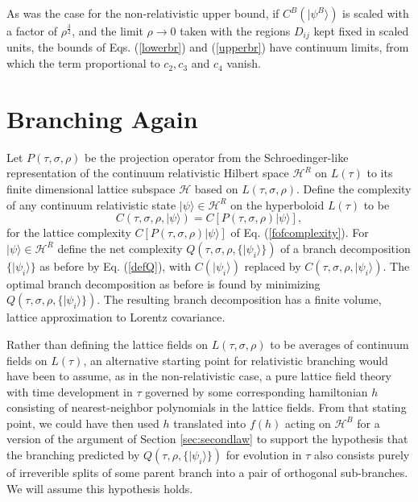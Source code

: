 \documentclass[twocolumn,amsmath,amssymb]{revtex4-1}
\begin{document}
As was the case for the
non-relativistic upper bound, if $C^B( |\psi^B \rangle )$ is scaled with a factor of $\rho^\frac{3}{2}$,
and the limit $\rho \rightarrow 0$ taken with
the regions $D_{ij}$ kept fixed in scaled units, the bounds of Eqs. (\ref{lowerbr}) and
(\ref{upperbr}) have continuum limits, from which the term proportional to $c_2, c_3$ and $c_4$
vanish.





\section{\label{subsec:relativisticbranching} Branching Again}

Let $P( \tau, \sigma, \rho)$ be the projection operator from the
Schroedinger-like representation of the
continuum relativistic Hilbert space $\mathcal{H}^R$
on $L( \tau)$ to its finite
dimensional lattice
subspace $\mathcal{H}$ based on $L(\tau, \sigma, \rho)$.
Define the complexity of any continuum relativistic state $|\psi \rangle  \in \mathcal{H}^R$
on the hyperboloid $L( \tau)$ to be
\begin{equation}
  \label{contcomplex}
  C( \tau, \sigma, \rho, |\psi \rangle ) = C[ P( \tau, \sigma, \rho) |\psi \rangle ],
\end{equation}
for the lattice complexity  $C[ P( \tau, \sigma, \rho) |\psi \rangle ]$
of Eq. (\ref{fofcomplexity}).
For $|\psi \rangle  \in \mathcal{H}^R$ 
define the net complexity $Q( \tau, \sigma, \rho, \{|\psi_i \rangle \})$ of 
a branch decomposition $\{|\psi_i \rangle \}$ 
as before by Eq. (\ref{defQ}), with $C( |\psi_i \rangle )$
replaced by $C( \tau, \sigma, \rho, |\psi_i \rangle )$.
The optimal branch decomposition as before is found by
minimizing $Q(\tau, \sigma, \rho, \{|\psi_i \rangle \})$.
The resulting branch decomposition has a finite volume, lattice
approximation to Lorentz covariance.

Rather than defining the lattice fields on $L( \tau, \sigma, \rho)$
to be averages of continuum fields on $L( \tau)$, an
alternative starting point for relativistic
branching would have been to
assume, as in the non-relativistic case, a pure
lattice field theory with time
development in $\tau$ governed by some corresponding
hamiltonian $h$ consisting of nearest-neighbor
polynomials in the lattice fields.
From that stating point, we could have then
used $h$ translated into $f(h)$ acting on $\mathcal{H}^B$
for a version of the argument of
Section \ref{sec:secondlaw} to support the
hypothesis that the branching predicted by
$Q(\tau, \rho, \{|\psi_i \rangle \})$
for evolution in $\tau$ also consists
purely of irreverible splits of
some parent branch into a pair of
orthogonal sub-branches.
We will assume this hypothesis
holds.
\end{document}

